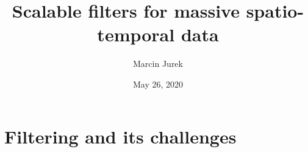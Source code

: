\documentclass[usenames,dvipsnames,svgnames,table]{beamer}
\title[Scalable filters]{Scalable filters for massive spatio-temporal data} %
\author[Jurek \& Katzfuss]{Marcin Jurek } %
\institute[Texas A\&M] %
{
Texas A\&M University \\ %
\medskip
}
\date{May 26, 2020} %
\begin{document}
\begin{frame}
\titlepage %
\end{frame}


\section{Filtering and its challenges}
\end{document}
